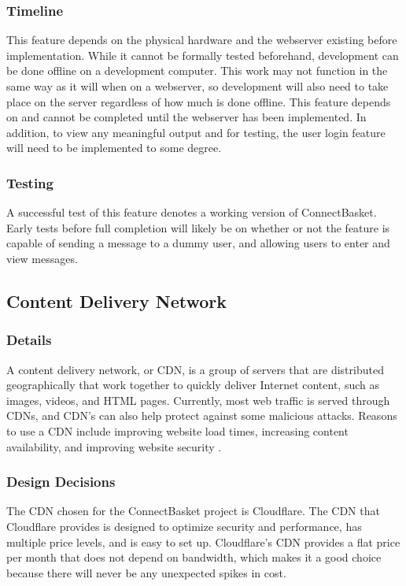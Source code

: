 \documentclass[onecolumn, draftclsnofoot,10pt, compsoc]{IEEEtran}
\begin{document}
\subsubsection{Timeline}
This feature depends on the physical hardware and the webserver existing before implementation. While it cannot be formally tested beforehand, development can be done offline on a development computer. This work may not function in the same way as it will when on a webserver, so development will also need to take place on the server regardless of how much is done offline. This feature depends on and cannot be completed until the webserver has been implemented. In addition, to view any meaningful output and for testing, the user login feature will need to be implemented to some degree.


\subsubsection{Testing}
A successful test of this feature denotes a working version of ConnectBasket. Early tests before full completion will likely be on whether or not the feature is capable of sending a message to a dummy user, and allowing users to enter and view messages.



\subsection{Content Delivery Network}

\subsubsection{Details}
A content delivery network, or CDN, is a group of servers that are distributed geographically that work together to quickly deliver Internet content, such as images, videos, and HTML pages. Currently, most web traffic is served through CDNs, and CDN's can also help protect against some malicious attacks. Reasons to use a CDN include improving website load times, increasing content availability, and improving website security \cite{cdn}.


\subsubsection{Design Decisions}
The CDN chosen for the ConnectBasket project is Cloudflare. The CDN that Cloudflare provides is designed to optimize security and performance, has multiple price levels, and is easy to set up. Cloudflare's CDN provides a flat price per month that does not depend on bandwidth, which makes it a good choice because there will never be any unexpected spikes in cost\cite{cloudflare}.
\end{document}
